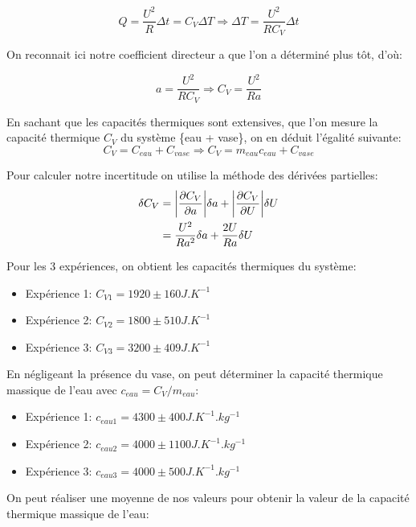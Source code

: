 \documentclass[12pt]{article}
\begin{document}
	\begin{equation}
Q=\frac{U^2}{R}\Delta t = C_V \Delta T 
\Rightarrow \Delta T =\frac{U^2}{RC_V}\Delta t
	\end{equation}

On reconnait ici notre coefficient directeur a que l'on a déterminé plus tôt, d'où:

\begin{equation}
a=\frac{U^2}{RC_V} \Rightarrow C_V=\frac{U^2}{Ra}
\end{equation}	

En sachant que les capacités thermiques sont extensives, que l'on mesure la capacité thermique $C_V$ du système \{eau + vase\}, on en déduit l'égalité suivante:
\begin{equation}
C_V=C_{eau}+C_{vase} \Rightarrow C_V = m_{eau} c_{eau} + C_{vase}
\end{equation}

Pour calculer notre incertitude on utilise la méthode des dérivées partielles:
\begin{align*}
\delta C_V & = \abs{\frac{\partial C_V}{\partial a}} \delta a + \abs{\frac{\partial C_V}{\partial U}} \delta U \\
&=\frac{U^2}{Ra^2}\delta a +\frac{2U}{Ra}\delta U
\end{align*}

Pour les 3 expériences, on obtient les capacités thermiques du système:
\begin{itemize}
	\item Expérience 1: $C_{V1} = 1920 \pm 160 J.K^{-1}$
	\item Expérience 2: $C_{V2} = 1800 \pm 510 J.K^{-1}$
	\item Expérience 3: $C_{V3} = 3200 \pm 409 J.K^{-1}$
\end{itemize}

En négligeant la présence du vase, on peut déterminer la capacité thermique massique de l'eau avec $c_{eau} = C_V/m_{eau}$:
\begin{itemize}
	\item Expérience 1: $c_{eau1} = 4300 \pm 400 J.K^{-1}.kg^{-1}$
	\item Expérience 2: $c_{eau2} = 4000 \pm 1100 J.K^{-1}.kg^{-1}$
	\item Expérience 3: $c_{eau3} = 4000 \pm 500 J.K^{-1}.kg^{-1}$
\end{itemize}

\newpage
On peut réaliser une moyenne de nos valeurs pour obtenir la valeur de la capacité thermique massique de l'eau:
\end{document}
